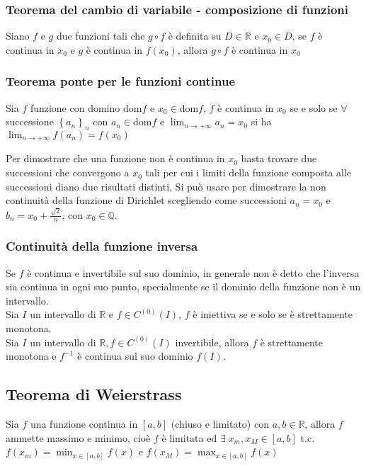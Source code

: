 \documentclass[a4paper]{article}
\newcommand\dom{\text{dom}}
\newcommand\cont[2]{C^{(#1)} \left({#2}\right)}
\begin{document}
\subsubsection*{Teorema del cambio di variabile - composizione di funzioni}
Siano \(f\) e \(g\) due funzioni tali che \(g \circ f\) è definita su \(D \in \mathbb{R}\) e \(x_0 \in D\),
se \(f\) è continua in \(x_0\) e \(g\) è continua in \(f(x_0)\), allora \(g \circ f\) è continua in \(x_0\)

\subsubsection*{Teorema ponte per le funzioni continue}
Sia \(f\) funzione con domino \(\dom f\) e \(x_0 \in \dom f\), \(f\) è continua in \(x_0\) se e solo se \(\forall\) successione \(\left\{a_n\right\}_n\)
con \(a_n \in \dom f\) e \(\displaystyle \lim_{n \to +\infty} a_n = x_0\) si ha \(\displaystyle \lim_{n \to +\infty} f(a_n) = f(x_0)\)

Per dimostrare che una funzione non è continua in \(x_0\) basta trovare due successioni che convergono a \(x_0\) tali per cui
i limiti della funzione composta alle successioni diano due risultati distinti. Si può usare per dimostrare la non continuità
della funzione di Dirichlet scegliendo come successioni \(a_n = x_0\) e \(b_n = x_0 + \frac{\sqrt{2}}{n}\), con \(x_0 \in \mathbb{Q}\).

\subsubsection*{Continuità della funzione inversa}
Se \(f\) è continua e invertibile sul suo dominio, in generale non è detto che l'inversa sia continua in ogni suo punto,
specialmente se il dominio della funzione non è un intervallo. \\
Sia \(I\) un intervallo di \(\mathbb{R}\) e \(f \in \cont{0}{I}\), \(f\) è iniettiva se e solo se è strettamente monotona. \\
Sia \(I\) un intervallo di \(\mathbb{R}, f \in \cont{0}{I}\) invertibile, allora \(f\) è strettamente monotona e \(f^{-1}\)
è continua sul suo dominio \(f(I)\).

\subsection{Teorema di Weierstrass}
Sia \(f\) una funzione continua in \(\left[a, b\right]\) (chiuso e limitato) con \(a,b \in \mathbb{R}\), allora \(f\) ammette massimo e minimo,
cioè \(f\) è limitata ed \(\exists \; x_m, x_M \in \left[a, b\right]\) t.c. \(\displaystyle f(x_m) = \min_{x \in \left[a, b\right]} f(x)\)
e \(\displaystyle f(x_M) = \max_{x \in \left[a, b\right]} f(x)\)
\end{document}
